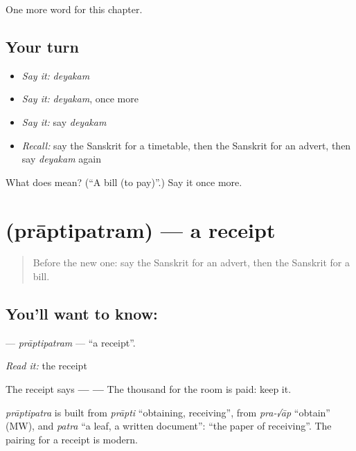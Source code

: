 \begin{grammarlens}[title={What you've built}]
One more word for this chapter.
\end{grammarlens}

\subsection*{Your turn}
\begin{itemize}
\raggedright
  \item \emph{Say it:} \emph{deyakam}
  \item \emph{Say it:} \emph{deyakam}, once more
  \item \emph{Say it:} say \emph{deyakam}
  \item \emph{Recall:} say the Sanskrit for a timetable, then the Sanskrit for an advert, then say \emph{deyakam} again
\end{itemize}

\begin{tcolorbox}[breakable,colback=teal!4,colframe=teal!35!black,title={Before you move on}]
What does  mean? (\textquotedblleft{}A bill (to pay)\textquotedblright{}.) Say it once more.
\end{tcolorbox}
\section[\texorpdfstring{\sk{प्राप्तिपत्रम्} (prāptipatram)}{प्राप्तिपत्रम् (prāptipatram)}]{ (prāptipatram) — a receipt}

\label{lesson:SA-C140-praptipatram}



\begin{quote}
Before the new one: say the Sanskrit for an advert, then the Sanskrit for a bill.
\end{quote}

\subsection*{You'll want to know: }
\textbf{} — \emph{prāptipatram} — \textquotedblleft{}a receipt\textquotedblright{}.

\emph{Read it:} the receipt

The receipt says \textbf{ —  — } The thousand for the room is paid: keep it.

\begin{cousinweb}
\emph{prāptipatra} is built from \emph{prāpti} \textquotedblleft{}obtaining, receiving\textquotedblright{}, from \emph{pra-√āp} \textquotedblleft{}obtain\textquotedblright{} (MW), and \emph{patra} \textquotedblleft{}a leaf, a written document\textquotedblright{}: \textquotedblleft{}the paper of receiving\textquotedblright{}. The pairing for a receipt is modern.
\end{cousinweb}

